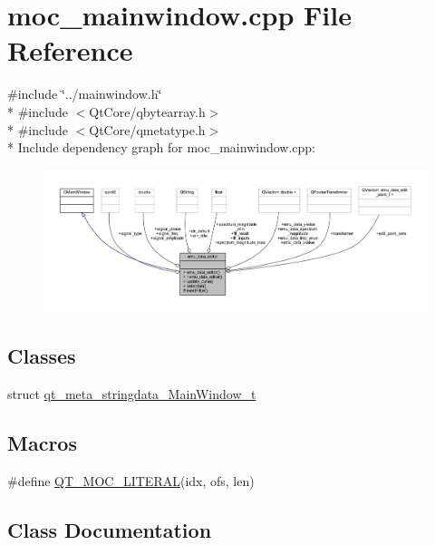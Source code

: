 \hypertarget{a00066}{\section{moc\+\_\+mainwindow.\+cpp File Reference}
\label{a00066}
}
{\ttfamily \#include \char`\"{}../mainwindow.\+h\char`\"{}}\\*
{\ttfamily \#include $<$Qt\+Core/qbytearray.\+h$>$}\\*
{\ttfamily \#include $<$Qt\+Core/qmetatype.\+h$>$}\\*
Include dependency graph for moc\+\_\+mainwindow.\+cpp\+:
\nopagebreak
\begin{figure}[H]
\begin{center}
\leavevmode
\includegraphics[width=350pt]{d5/d7b/a00286}
\end{center}
\end{figure}
\subsection*{Classes}
\begin{DoxyCompactItemize}
\item 
struct \hyperlink{a00066_da/deb/a00189}{qt\+\_\+meta\+\_\+stringdata\+\_\+\+Main\+Window\+\_\+t}
\end{DoxyCompactItemize}
\subsection*{Macros}
\begin{DoxyCompactItemize}
\item 
\#define \hyperlink{a00066_a75bb9482d242cde0a06c9dbdc6b83abe}{Q\+T\+\_\+\+M\+O\+C\+\_\+\+L\+I\+T\+E\+R\+A\+L}(idx, ofs, len)
\end{DoxyCompactItemize}


\subsection{Class Documentation}
\label{da/deb/a00189}
\hypertarget{a00066_da/deb/a00189}{}
